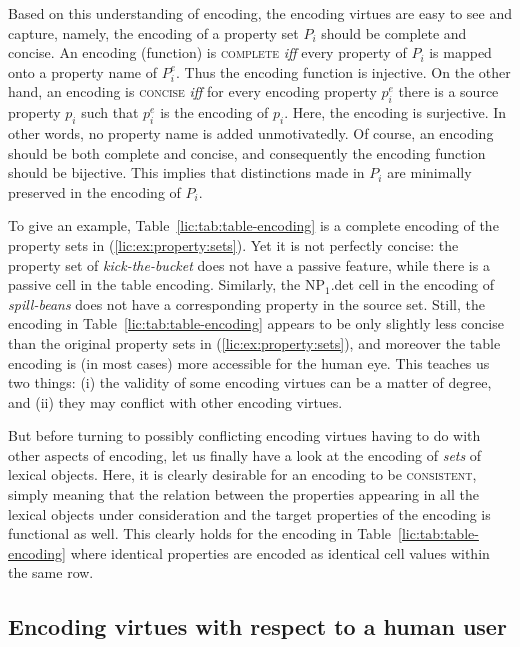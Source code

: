 \documentclass[output=paper
,modfonts
,nonflat
,biblatexbackend=biber
]{langsci/langscibook}
\begin{document}
Based on this understanding of encoding, the encoding virtues are easy to see and capture, namely, the encoding of a property set $P_i$ should be complete and concise. An encoding (function) is \textsc{complete} \textit{iff} every property of $P_i$ is mapped onto a property name of $P^e_i$. Thus the encoding function is injective. On the other hand, an encoding is \textsc{concise} \textit{iff} for every encoding property $p^e_i$ there is a source property $p_i$ such that $p^e_i$ is the encoding of $p_i$. Here, the encoding is surjective. In other words, no property name is added unmotivatedly. Of course, an encoding should be both complete and concise, and consequently the encoding function should be bijective. This implies that distinctions made in $P_i$ are minimally preserved in the encoding of $P_i$.

To give an example, Table~\ref{lic:tab:table-encoding} is a complete encoding of the property sets in (\ref{lic:ex:property:sets}). Yet it is not perfectly concise: the property set of \textit{kick-the-bucket} does not have a passive feature, while there is a passive cell in the table encoding. Similarly, the NP$_1$.det cell in the encoding of \textit{spill-beans} does not have a corresponding property in the source set. Still, the encoding in Table~\ref{lic:tab:table-encoding} appears to be only slightly less concise than the original property sets in (\ref{lic:ex:property:sets}), and moreover the table encoding is (in most cases) more accessible for the human eye. This teaches us two things: (i) the validity of some encoding virtues can be a matter of degree, and (ii) they may conflict with other encoding virtues.

But before turning to possibly conflicting encoding virtues having to do with other aspects of encoding, let us finally have a look at the encoding of \textit{sets} of lexical objects. Here, it is clearly desirable for an encoding to be \textsc{consistent}, simply meaning that the relation between the properties appearing in all the lexical objects under consideration and the target properties of the encoding is functional as well. This clearly holds for the encoding in Table~\ref{lic:tab:table-encoding} where identical properties are encoded as identical cell values within the same row.

  
\subsection{Encoding virtues with respect to a human user}
\label{lic:sec:virtues-human}
\end{document}
